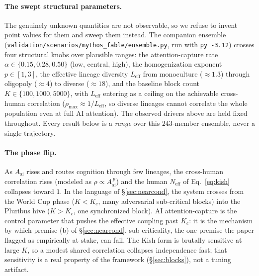 \documentclass[11pt]{article}
\begin{document}
\paragraph{The swept structural parameters.} The genuinely unknown quantities are not observable, so we refuse to invent point values for them and sweep them instead. The companion ensemble (\texttt{validation/scenarios/mythos\_fable/ensemble.py}, run with \texttt{py -3.12}) crosses four structural knobs over plausible ranges: the attention-capture rate $\alpha \in \{0.15, 0.28, 0.50\}$ (low, central, high), the homogenization exponent $p \in [1,3]$, the effective lineage diversity $L_{\mathrm{eff}}$ from monoculture ($\approx 1.3$) through oligopoly ($\approx 4$) to diverse ($\approx 18$), and the baseline block count $K \in \{100, 1000, 5000\}$, with $L_{\mathrm{eff}}$ entering as a ceiling on the achievable cross-human correlation ($\rho_{\max}\!\approx\!1/L_{\mathrm{eff}}$, so diverse lineages cannot correlate the whole population even at full AI attention). The observed drivers above are held fixed throughout. Every result below is a \emph{range} over this $243$-member ensemble, never a single trajectory.

\paragraph{The phase flip.} As $A_{\mathrm{ai}}$ rises and routes cognition through few lineages, the cross-human correlation rises (modeled as $\rho \propto A_{\mathrm{ai}}^{\,p}$) and the human $N_{\mathrm{eff}}$ of Eq.~\eqref{eq:kish} collapses toward $1$. In the language of \S\ref{sec:nearcond}, the system crosses from the World Cup phase ($K<K_c$, many adversarial sub-critical blocks) into the Pluribus hive ($K>K_c$, one synchronized block). AI attention-capture is the control parameter that pushes the effective coupling past $K_c$: it is the mechanism by which premise (b) of \S\ref{sec:nearcond}, sub-criticality, the one premise the paper flagged as empirically at stake, can fail. The Kish form is brutally sensitive at large $K$, so a modest shared correlation collapses independence fast; that sensitivity is a real property of the framework (\S\ref{sec:blocks}), not a tuning artifact.
\end{document}

